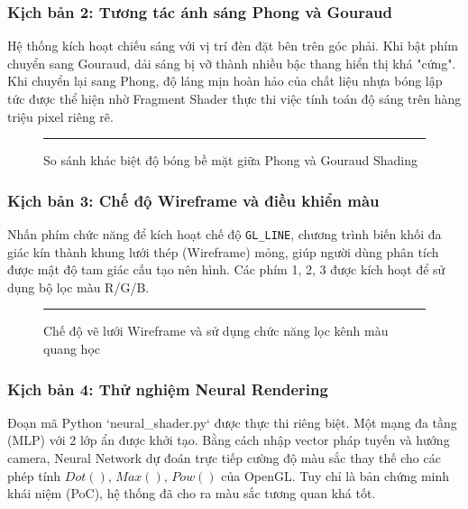 \documentclass[13pt, a4paper]{extarticle}
\begin{document}
\subsubsection{Kịch bản 2: Tương tác ánh sáng Phong và Gouraud}
Hệ thống kích hoạt chiếu sáng với vị trí đèn đặt bên trên góc phải. Khi bật phím chuyển sang Gouraud, dải sáng bị vỡ thành nhiều bậc thang hiển thị khá "cứng". Khi chuyển lại sang Phong, độ láng mịn hoàn hảo của chất liệu nhựa bóng lập tức được thể hiện nhờ Fragment Shader thực thi việc tính toán độ sáng trên hàng triệu pixel riêng rẽ.
\begin{figure}[H] \centering \rule{10cm}{6cm} \caption{So sánh khác biệt độ bóng bề mặt giữa Phong và Gouraud Shading} \end{figure}

\subsubsection{Kịch bản 3: Chế độ Wireframe và điều khiển màu}
Nhấn phím chức năng để kích hoạt chế độ \texttt{GL\_LINE}, chương trình biến khối đa giác kín thành khung lưới thép (Wireframe) mỏng, giúp người dùng phân tích được mật độ tam giác cấu tạo nên hình. Các phím 1, 2, 3 được kích hoạt để sử dụng bộ lọc màu R/G/B.
\begin{figure}[H] \centering \rule{10cm}{6cm} \caption{Chế độ vẽ lưới Wireframe và sử dụng chức năng lọc kênh màu quang học} \end{figure}

\subsubsection{Kịch bản 4: Thử nghiệm Neural Rendering}
Đoạn mã Python `neural\_shader.py` được thực thi riêng biệt. Một mạng đa tầng (MLP) với 2 lớp ẩn được khởi tạo. Bằng cách nhập vector pháp tuyến và hướng camera, Neural Network dự đoán trực tiếp cường độ màu sắc thay thế cho các phép tính $Dot()$, $Max()$, $Pow()$ của OpenGL. Tuy chỉ là bản chứng minh khái niệm (PoC), hệ thống đã cho ra màu sắc tương quan khá tốt.
\end{document}
